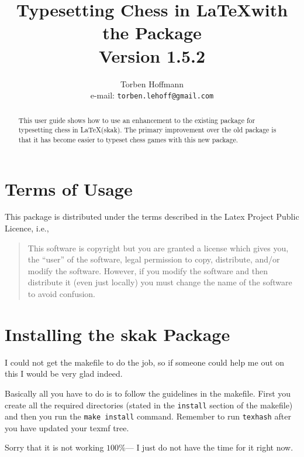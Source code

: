 \documentclass[10pt]{article}
\title{Typesetting Chess in \LaTeX with the \package{skak} Package\\
Version 1.5.2}
\author{Torben Hoffmann\\ e-mail: \texttt{torben.lehoff@gmail.com}}
\newcommand{\package}[1]{\textsf{#1}}
\begin{document}
\maketitle

\begin{abstract}
  This user guide shows how to use an enhancement to the existing
  package for typesetting chess in \LaTeX (\package{skak}). The
  primary improvement over the old package is that it has become
  easier to typeset chess games with this new package.
\end{abstract}

\newpage
\tableofcontents
\newpage



\section{Terms of Usage}
\label{sec:terms-usage}

This package is distributed under the terms described in the Latex
Project Public Licence, i.e.,

\begin{quote}
  This software is copyright but you are granted a license which gives
  you, the ``user'' of the software, legal permission to copy,
  distribute, and/or modify the software. However, if you modify the
  software and then distribute it (even just locally) you must change
  the name of the software to avoid confusion.
\end{quote}



\section{Installing the \package{skak} Package}
\label{sec:install}

I could not get the makefile to do the job, so if someone could help
me out on this I would be very glad indeed.

Basically all you have to do is to follow the guidelines in the
makefile. First you create all the required directories (stated in the
\texttt{install} section of the makefile) and then you run the
\texttt{make install} command. Remember to run \texttt{texhash} after
you have updated your texmf tree.

Sorry that it is not working $100\%$--- I just do not have the time for
it right now.
\end{document}
